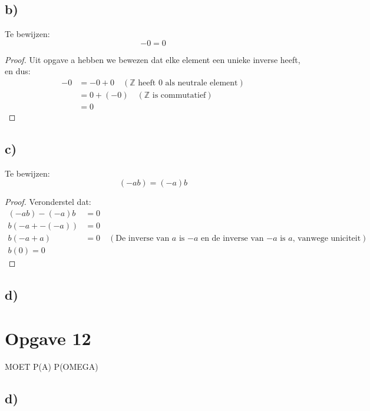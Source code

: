 \documentclass{article}
\newcommand{\Z}{\mathbb{Z}}
\newcommand{\tx}[1]{\text{#1}}
\begin{document}
\subsection*{b)}
Te bewijzen:
\[ -0 = 0 \]
\begin{proof}
    Uit opgave a hebben we bewezen dat elke element een unieke inverse heeft, en dus:
    \begin{align*}
        -0 & = -0 + 0  \quad (\Z \tx{ heeft $0$ als neutrale element}) \\
           & = 0 + (-0) \quad (\Z \tx{ is commutatief})                \\
           & = 0
    \end{align*}
\end{proof}

\subsection*{c)}
Te bewijzen:
\[(-ab) = (-a)b \]
\begin{proof}
    Veronderstel dat:
    \begin{align*}
        (-ab) - (-a)b & = 0                                                                                          \\
        b(-a + -(-a)) & = 0                                                                                          \\
        b(-a + a)     & = 0 \quad (\tx{De inverse van $a$ is $-a$ en de inverse van $-a$ is $a$, vanwege uniciteit}) \\
        b(0) = 0
    \end{align*}
\end{proof}


\subsection*{d)}



\section*{Opgave 12} MOET P(A) P(OMEGA)
\subsection*{d)}
\end{document}

